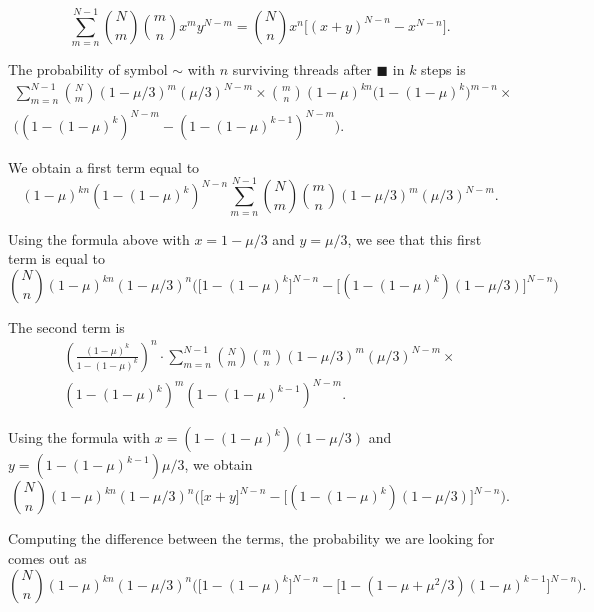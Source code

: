 \documentclass{article}
\newcommand{\eqg}{\scriptstyle{\sim}}
\begin{document}
\begin{equation*}
\sum_{m=n}^{N-1} {N \choose m} {m \choose n} x^m y^{N-m} =
{N \choose n} x^n \Big[ (x+y)^{N-n} - x^{N-n} \Big].
\end{equation*}

The probability of symbol $\eqg$ with $n$ surviving threads after
$\scriptstyle{\blacksquare}$ in $k$ steps is
\begin{equation*}
\begin{split}
\sum_{m=n}^{N-1} {N \choose m} (1-\mu/3)^m (\mu/3)^{N-m} \times
{m \choose n} (1-\mu)^{kn} \big(1-(1-\mu)^k\big)^{m-n} \times \\
\Big( (1-(1-\mu)^k)^{N-m} - (1-(1-\mu)^{k-1})^{N-m} \Big).
\end{split}
\end{equation*}

We obtain a first term equal to
\begin{equation*}
(1-\mu)^{kn} (1-(1-\mu)^k)^{N-n}
\sum_{m=n}^{N-1} {N \choose m} {m \choose n} (1-\mu/3)^m (\mu/3)^{N-m}.
\end{equation*}

Using the formula above with $x=1-\mu/3$ and $y=\mu/3$, we see that this
first term is equal to
\begin{equation*}
{N \choose n} (1-\mu)^{kn} (1-\mu/3)^n \bigg( \big[ 1-(1-\mu)^k \big]^{N-n}
-\big[ (1-(1-\mu)^k)(1-\mu/3)\big]^{N-n} \bigg)
\end{equation*}

The second term is
\begin{equation*}
\begin{split}
\left(\frac{(1-\mu)^k}{1-(1-\mu)^k}\right)^n \cdot
\sum_{m=n}^{N-1} {N \choose m} {m \choose n} (1-\mu/3)^m (\mu/3)^{N-m}
\times \\
(1-(1-\mu)^k)^m (1-(1-\mu)^{k-1})^{N-m}.
\end{split}
\end{equation*}

Using the formula with $x=(1-(1-\mu)^k)(1-\mu/3)$ and
$y = (1-(1-\mu)^{k-1})\mu/3$, we obtain
\begin{equation*}
{N \choose n} (1-\mu)^{kn} (1-\mu/3)^n
\bigg( \big[ x+y \big]^{N-n}
-\big[ (1-(1-\mu)^k)(1-\mu/3)\big]^{N-n} \bigg).
\end{equation*}

Computing the difference between the terms, the probability we are
looking for comes out as
\begin{equation*}
{N \choose n} (1-\mu)^{kn} (1-\mu/3)^n \bigg(
\big[ 1-(1-\mu)^k \big]^{N-n} -
\big[1-(1-\mu+\mu^2/3)(1-\mu)^{k-1} \big]^{N-n} \bigg).
\end{equation*}
\end{document}
